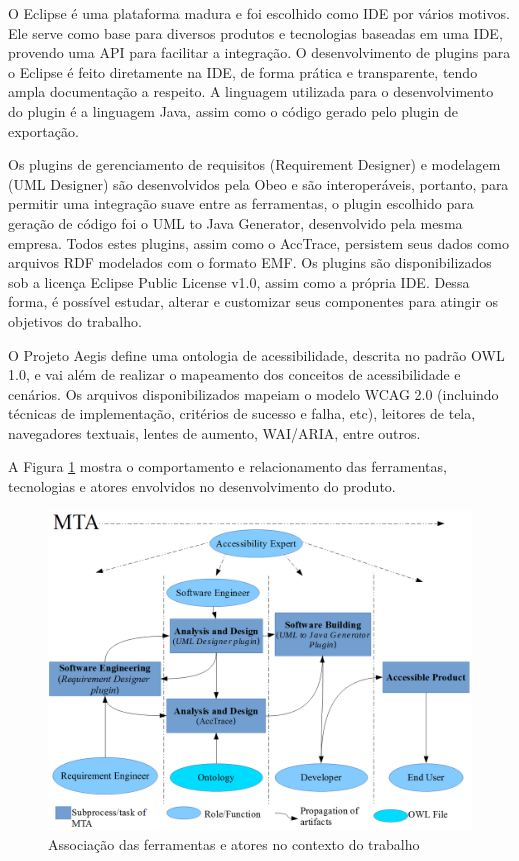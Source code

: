 \documentclass[runningheads,a4paper]{llncs}
\begin{document}
O Eclipse é uma plataforma madura e foi escolhido como IDE por vários motivos. Ele
serve como base para diversos produtos e tecnologias baseadas em uma IDE, provendo
uma API para facilitar a integração. O desenvolvimento de plugins para o Eclipse é feito diretamente na IDE,
de forma prática e transparente, tendo ampla documentação a respeito. A linguagem
utilizada para o desenvolvimento do plugin é a linguagem Java, assim como o código
gerado pelo plugin de exportação.

Os plugins de gerenciamento de requisitos (Requirement Designer) e modelagem (UML Designer) são desenvolvidos pela Obeo e são interoperáveis, portanto, para permitir uma integração suave entre as ferramentas, o plugin escolhido para geração de código foi o UML to Java Generator, desenvolvido pela
mesma empresa. Todos estes plugins, assim como o AccTrace, persistem seus dados como arquivos RDF modelados com o formato EMF. Os plugins são disponibilizados sob a licença Eclipse Public License v1.0, assim como a própria IDE. Dessa forma, é possível estudar, alterar e customizar seus componentes para atingir os objetivos do trabalho.

O Projeto Aegis \cite{aegis:13} define uma ontologia de acessibilidade, descrita no padrão OWL 1.0, e vai além de realizar o mapeamento dos conceitos de acessibilidade e cenários. Os arquivos disponibilizados mapeiam o modelo WCAG 2.0 (incluindo técnicas de implementação, critérios de sucesso e falha, etc), leitores de tela, navegadores textuais, lentes de aumento, WAI/ARIA, entre outros.

A Figura \ref{fig:association} mostra o comportamento e relacionamento das ferramentas, tecnologias
e atores envolvidos no desenvolvimento do produto.

\begin{figure}[h!]
\centering
\includegraphics[scale=0.25]{./img/developmentNew2.png}
\caption{Associação das ferramentas e atores no contexto do trabalho}
\label{fig:association}
\end{figure}
\end{document}

